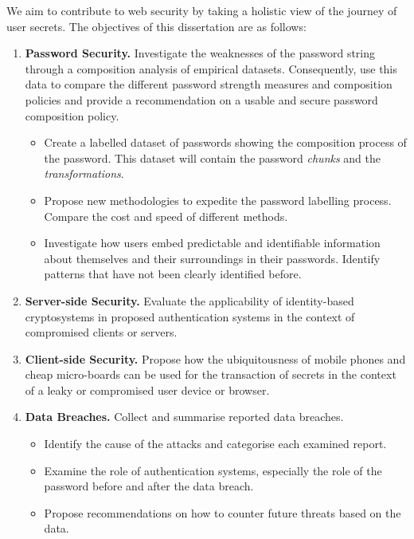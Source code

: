 We aim to contribute to web security by taking a holistic view of the journey of user secrets. The objectives of this dissertation are as follows:

\begin{enumerate}
\item \textbf{Password Security.} Investigate the weaknesses of the password string through a composition analysis of empirical datasets. Consequently, use this data to compare the different password strength measures and composition policies and provide a recommendation on a usable and secure password composition policy.
\begin{itemize}
\item Create a labelled dataset of passwords showing the composition process of the password. This dataset will contain the password \textit{chunks} and the \textit{transformations}.
\item Propose new methodologies to expedite the password labelling process. Compare the cost and speed of different methods.
\item Investigate how users embed predictable and identifiable information about themselves and their surroundings in their passwords. Identify patterns that have not been clearly identified before.
\end{itemize}

\item \textbf{Server-side Security.} Evaluate the applicability of identity-based cryptosystems in proposed authentication systems in the context of compromised clients or servers.

\item \textbf{Client-side Security.} Propose how the ubiquitousness of mobile phones and cheap micro-boards can be used for the transaction of secrets in the context of a leaky or compromised user device or browser.

\item \textbf{Data Breaches.} Collect and summarise reported data breaches.
\begin{itemize}
    \item Identify the cause of the attacks and categorise each examined report.
    \item Examine the role of authentication systems, especially the role of the password before and after the data breach.
    \item Propose recommendations on how to counter future threats based on the data.
\end{itemize}
\end{enumerate}

